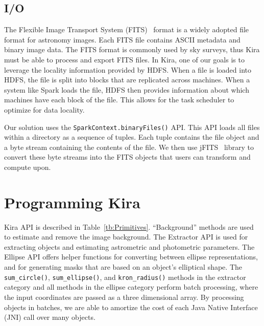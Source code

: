 \documentclass[conference]{IEEEtran}
\begin{document}
\subsection{I/O}
\label{sec:Design-I/O}
The Flexible Image Transport System (FITS)~\cite{wells81} format is a widely adopted file format for astronomy
images. Each FITS file contains ASCII metadata and binary image data.
The FITS format is commonly used by sky surveys, thus Kira must be able to process and export FITS files.
In Kira, one of our goals is to leverage the locality information provided by HDFS. When a file is loaded into 
HDFS, the file is split into blocks that are replicated across machines. When a system like Spark loads the file, 
HDFS then provides information about which machines have each block of the file. This allows for the task 
scheduler to optimize for data locality.


Our solution uses the \texttt{SparkContext.binaryFiles()} API.
This API loads all files within a directory as a sequence of tuples. Each tuple contains the file object and a byte
stream containing the contents of the file. We then use jFITS~\cite{jfits} library to convert these byte streams 
into the FITS objects that users can transform and compute upon. 

 
\section{Programming Kira}
\label{sec:Programming}
Kira API is described
in Table~\ref{tb:Primitives}. ``Background'' methods are used to estimate and remove the image background. The Extractor
API is used for extracting objects and estimating astrometric and photometric parameters. The Ellipse API offers helper
functions for converting between ellipse representations, and for generating masks that are based on an object's elliptical
shape. The \texttt{sum\_circle()}, \texttt{sum\_ellipse()}, and \texttt{kron\_radius()} methods in the extractor category and all
methods in the ellipse category perform batch processing, where the input coordinates are passed as a three dimensional array. By processing objects
in batches, we are able to amortize the cost of each Java Native Interface (JNI) call over many objects.
\end{document}
